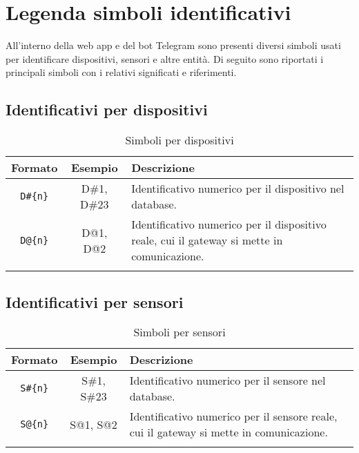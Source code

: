 \section{Legenda simboli identificativi}

All'interno della web app e del bot Telegram sono presenti diversi simboli usati per identificare dispositivi, sensori e altre entità. Di seguito sono riportati i principali simboli con i relativi significati e riferimenti.

\subsection{Identificativi per dispositivi}

\begin{center}
	\begin{longtable}{|c|c|p{12cm}|}
	\hline
	\rowcolor{lighter-grayer}
	\textbf{Formato} & \textbf{Esempio} & \textbf{Descrizione} \\
	\hline
	\endfirsthead
	
	\verb!D#{n}! & D\#1, D\#23  & Identificativo numerico per il dispositivo nel database. \\
	\hline

	\verb!D@{n}! & D@1, D@2  & Identificativo numerico per il dispositivo reale, cui il gateway si mette in comunicazione. \\
	\hline

	\caption{Simboli per dispositivi}
	\end{longtable}
\end{center}


\subsection{Identificativi per sensori}

\begin{center}
	\begin{longtable}{|c|c|p{12cm}|}
	\hline
	\rowcolor{lighter-grayer}
	\textbf{Formato} & \textbf{Esempio} & \textbf{Descrizione} \\
	\hline
	\endfirsthead
	
	\verb!S#{n}! & S\#1, S\#23  & Identificativo numerico per il sensore nel database. \\
	\hline

	\verb!S@{n}! & S@1, S@2  & Identificativo numerico per il sensore reale, cui il gateway si mette in comunicazione. \\
	\hline

	\caption{Simboli per sensori}
	\end{longtable}
\end{center}



